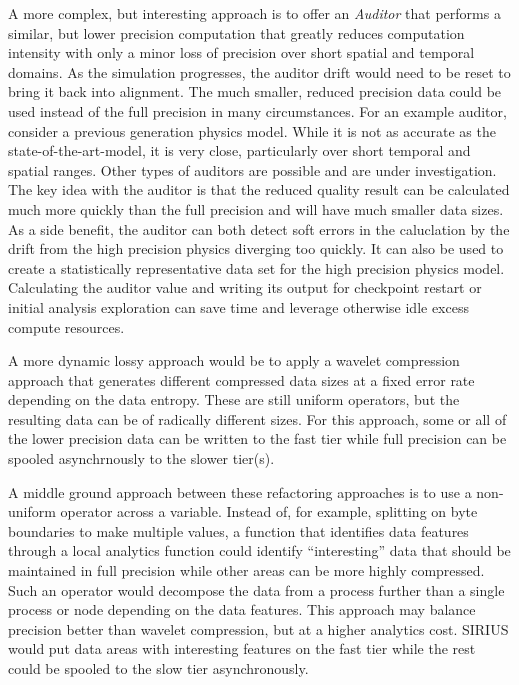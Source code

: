 \documentclass[letterpaper,twocolumn,10pt]{article}
\begin{document}
A more complex, but interesting approach is to offer an {\em Auditor} that
performs a similar, but lower precision computation that greatly reduces
computation intensity with only a minor loss of precision over short spatial
and temporal domains. As the simulation progresses, the auditor drift would
need to be reset to bring it back into alignment. The much smaller, reduced
precision data could be used instead of the full precision in many
circumstances.  For an example auditor, consider a previous generation physics
model. While it is not as accurate as the state-of-the-art-model, it is very
close, particularly over short temporal and spatial ranges. Other types of
auditors are possible and are under investigation. The key idea with the
auditor is that the reduced quality result can be calculated much more quickly
than the full precision and will have much smaller data sizes. As a side
benefit, the auditor can both detect soft errors in the caluclation by the
drift from the high precision physics diverging too quickly. It can also be
used to create a statistically representative data set for the high precision
physics model. Calculating the auditor value and writing its output for
checkpoint restart or initial analysis exploration can save time and leverage
otherwise idle excess compute resources.

A more dynamic lossy approach would be to apply a wavelet
compression~\cite{klappenecker:1995:wavelet} approach that generates different
compressed data sizes at a fixed error rate depending on the data entropy.
These are still uniform operators, but the resulting data can be of radically
different sizes. For this approach, some or all of the lower precision data
can be written to the fast tier while full precision can be spooled
asynchrnously to the slower tier(s).

A middle ground approach between these refactoring approaches is to use a
non-uniform operator across a variable. Instead of, for example, splitting on
byte boundaries to make multiple values, a function that identifies data
features through a local analytics function could identify ``interesting'' data
that should be maintained in full precision while other areas can be more
highly compressed. Such an operator would decompose the data from a process
further than a single process or node depending on the data features. This
approach may balance precision better than wavelet compression, but at a higher
analytics cost. SIRIUS would put data areas with interesting features on the
fast tier while the rest could be spooled to the slow tier asynchronously.
\end{document}
